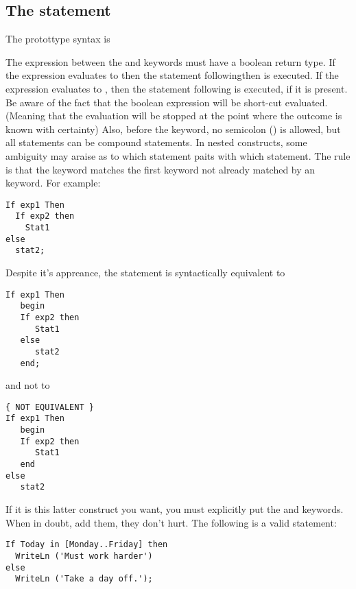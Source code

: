 \documentclass{report}
\begin{document}
\subsection{The  statement}
The  protottype syntax is

The expression between the  and  keywords must have a
boolean return type. If the expression evaluates to  then the
statement following{then} is executed. If the expression evaluates to
, then the statement following  is executed, if it is
present.
Be aware of the fact that the boolean expression will be short-cut evaluated.
(Meaning that the evaluation will be stopped at the point where the
 outcome is known with certainty)
Also, before the  keyword,  no semicolon (\var{;}) is allowed,
but all statements can be compound statements.
In nested  constructs, some ambiguity may araise as
to which   statement paits with which  statement. The rule
is that the  keyword matches the first  keyword not
already matched by an  keyword.
For example:
\begin{verbatim}
If exp1 Then
  If exp2 then
    Stat1
else
  stat2;
\end{verbatim}
Despite it's appreance, the statement is syntactically equivalent to
\begin{verbatim}
If exp1 Then
   begin
   If exp2 then
      Stat1
   else
      stat2
   end;
\end{verbatim}
and not to
\begin{verbatim}
{ NOT EQUIVALENT }
If exp1 Then
   begin
   If exp2 then
      Stat1
   end
else
   stat2
\end{verbatim}
If it is this latter construct you want, you must explicitly put the
 and  keywords. When in doubt, add them, they don't
hurt.
The following is a valid statement:
\begin{verbatim}
If Today in [Monday..Friday] then
  WriteLn ('Must work harder')
else
  WriteLn ('Take a day off.');
\end{verbatim}
\end{document}
